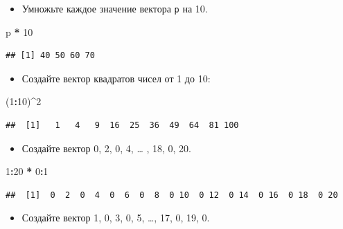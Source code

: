 \documentclass[]{book}
\newenvironment{Shaded}{\begin{snugshade}}{\end{snugshade}}
\newcommand{\DecValTok}[1]{\textcolor[rgb]{0.00,0.00,0.81}{#1}}
\newcommand{\StringTok}[1]{\textcolor[rgb]{0.31,0.60,0.02}{#1}}
\newcommand{\OperatorTok}[1]{\textcolor[rgb]{0.81,0.36,0.00}{\textbf{#1}}}
\newcommand{\NormalTok}[1]{#1}
\providecommand{\tightlist}{%
  \setlength{\itemsep}{0pt}\setlength{\parskip}{0pt}}
\begin{document}
\begin{itemize}
\tightlist
\item
  Умножьте каждое значение вектора \texttt{p} на 10.
\end{itemize}

\begin{Shaded}
\begin{Highlighting}[]
\NormalTok{p }\OperatorTok{*}\StringTok{ }\DecValTok{10}
\end{Highlighting}
\end{Shaded}

\begin{verbatim}
## [1] 40 50 60 70
\end{verbatim}

\begin{itemize}
\tightlist
\item
  Создайте вектор квадратов чисел от 1 до 10:
\end{itemize}

\begin{Shaded}
\begin{Highlighting}[]
\NormalTok{(}\DecValTok{1}\OperatorTok{:}\DecValTok{10}\NormalTok{)}\OperatorTok{^}\DecValTok{2}
\end{Highlighting}
\end{Shaded}

\begin{verbatim}
##  [1]   1   4   9  16  25  36  49  64  81 100
\end{verbatim}

\begin{itemize}
\tightlist
\item
  Создайте вектор 0, 2, 0, 4, \ldots{} , 18, 0, 20.
\end{itemize}

\begin{Shaded}
\begin{Highlighting}[]
\DecValTok{1}\OperatorTok{:}\DecValTok{20} \OperatorTok{*}\StringTok{ }\DecValTok{0}\OperatorTok{:}\DecValTok{1}
\end{Highlighting}
\end{Shaded}

\begin{verbatim}
##  [1]  0  2  0  4  0  6  0  8  0 10  0 12  0 14  0 16  0 18  0 20
\end{verbatim}

\begin{itemize}
\tightlist
\item
  Создайте вектор 1, 0, 3, 0, 5, \ldots{}, 17, 0, 19, 0.
\end{itemize}
\end{document}

